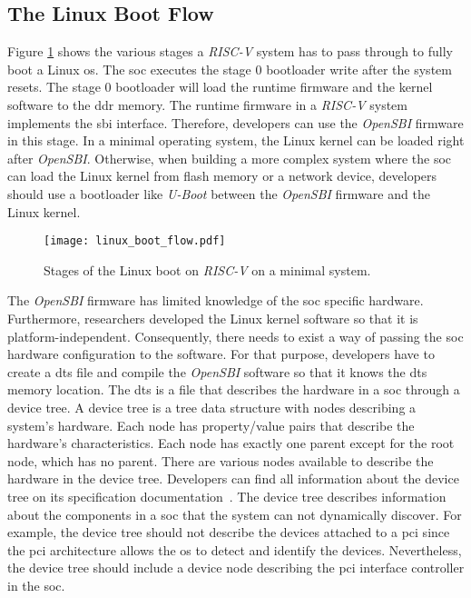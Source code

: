 \subsection{The Linux Boot Flow}
\label{subsection:linux_boot_flow}
Figure \ref{fig:linux_boot_flow} shows the various stages a \textit{RISC-V} system has to pass through to fully boot a Linux \acrlong{os}. The \acrshort{soc} executes the stage 0 bootloader write after the system resets. The stage 0 bootloader will load the runtime firmware and the kernel software to the \acrfull{ddr} memory. The runtime firmware in a \textit{RISC-V} system implements the \acrshort{sbi} interface. Therefore, developers can use the \textit{OpenSBI} firmware in this stage. In a minimal operating system, the Linux kernel can be loaded right after \textit{OpenSBI}. Otherwise, when building a more complex system where the \acrshort{soc} can load the Linux kernel from flash memory or a network device, developers should use a bootloader like \textit{U-Boot} between the \textit{OpenSBI} firmware and the Linux kernel.

\begin{figure}[!h]
    \centering
    \texttt{[image: linux\_boot\_flow.pdf]}
    \caption{Stages of the Linux boot on \textit{RISC-V} on a minimal system.}
    \label{fig:linux_boot_flow}
\end{figure}

The \textit{OpenSBI} firmware has limited knowledge of the \acrshort{soc} specific hardware. Furthermore, researchers developed the Linux kernel software so that it is platform-independent. Consequently, there needs to exist a way of passing the \acrshort{soc} hardware configuration to the software. For that purpose, developers have to create a \acrfull{dts} file and compile the \textit{OpenSBI} software so that it knows the \acrshort{dts} memory location. The \acrlong{dts} is a file that describes the hardware in a \acrshort{soc} through a device tree. A device tree is a tree data structure with nodes describing a system's hardware. Each node has property/value pairs that describe the hardware's characteristics. Each node has exactly one parent except for the root node, which has no parent. There are various nodes available to describe the hardware in the device tree. Developers can find all information about the device tree on its specification documentation~\cite{devicetree_spec}. The device tree describes information about the components in a \acrshort{soc} that the system can not dynamically discover. For example, the device tree should not describe the devices attached to a \acrfull{pci} since the \acrshort{pci} architecture allows the \acrshort{os} to detect and identify the devices. Nevertheless, the device tree should include a device node describing the \acrshort{pci} interface controller in the \acrshort{soc}.

